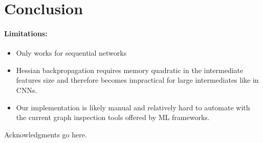 \documentclass{article}
\begin{document}
\section{Conclusion}

\paragraph{Limitations:}
\begin{itemize}
\item Only works for sequential networks
\item Hessian backpropagation requires memory quadratic in the intermediate features size and therefore becomes impractical for large intermediates like in CNNs.
\item Our implementation is likely manual and relatively hard to automate with the current graph inspection tools offered by ML frameworks.
\end{itemize}

\begin{ack} %
  Acknowledgments go here.
\end{ack}




\appendix



\end{document}
